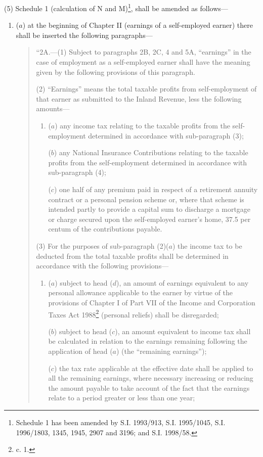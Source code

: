 \documentclass[12pt,a4paper]{article}
\begin{document}
(5) Schedule 1 (calculation of N and M)\footnote{\frenchspacing Schedule 1 has been amended by S.I. 1993/913, S.I. 1995/1045, S.I. 1996/1803, 1345, 1945, 2907 and 3196; and S.I. 1998/58.}, shall be amended as follows—
\begin{enumerate}\item[]
($a$) at the beginning of Chapter II (earnings of a self-employed earner) there shall be inserted the following paragraphs—
\begin{quotation}
“2A.—(1) Subject to paragraphs 2B, 2C, 4 and 5A, “earnings” in the case of employment as a self-employed earner shall have the meaning given by the following provisions of this paragraph.

(2) “Earnings” means the total taxable profits from self-employment of that earner as submitted to the Inland Revenue, less the following amounts—
\begin{enumerate}\item[]
($a$) any income tax relating to the taxable profits from the self-employment determined in accordance with sub-paragraph (3);

($b$) any National Insurance Contributions relating to the taxable profits from the self-employment determined in accordance with sub-paragraph (4);

($c$) one half of any premium paid in respect of a retirement annuity contract or a personal pension scheme or, where that scheme is intended partly to provide a capital sum to discharge a mortgage or charge secured upon the self-employed earner’s home, 37.5 per centum of the contributions payable.
\end{enumerate}

(3) For the purposes of sub-paragraph (2)($a$) the income tax to be deducted from the total taxable profits shall be determined in accordance with the following provisions—
\begin{enumerate}\item[]
($a$) subject to head ($d$), an amount of earnings equivalent to any personal allowance applicable to the earner by virtue of the provisions of Chapter I of Part VII of the Income and Corporation Taxes Act 1988\footnote{ c. 1.} (personal reliefs) shall be disregarded;

($b$) subject to head ($c$), an amount equivalent to income tax shall be calculated in relation to the earnings remaining following the application of head ($a$) (the “remaining earnings”);

($c$) the tax rate applicable at the effective date shall be applied to all the remaining earnings, where necessary increasing or reducing the amount payable to take account of the fact that the earnings relate to a period greater or less than one year;


\end{enumerate}
\end{quotation}
\end{enumerate}
\end{document}

